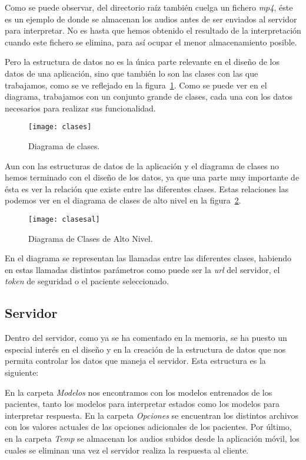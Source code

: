Como se puede observar, del directorio raíz también cuelga un fichero \textit{mp4}, éste es un ejemplo de donde se almacenan los audios antes de ser enviados al servidor para interpretar. No es hasta que hemos obtenido el resultado de la interpretación cuando este fichero se elimina, para así ocupar el menor almacenamiento posible.

Pero la estructura de datos no es la única parte relevante en el diseño de los datos de una aplicación, sino que también lo son las clases con las que trabajamos, como se ve reflejado en la figura~\ref{fig:clases}. Como se puede ver en el diagrama, trabajamos con un conjunto grande de clases, cada una con los datos necesarios para realizar sus funcionalidad.

\begin{figure}[H]
	\centering
	\texttt{[image: clases]}
	\caption{Diagrama de clases.}
	\label{fig:clases}
\end{figure}

Aun con las estructuras de datos de la aplicación y el diagrama de clases no hemos terminado con el diseño de los datos, ya que una parte muy importante de ésta es ver la relación que existe entre las diferentes clases. Estas relaciones las podemos ver en el diagrama de clases de alto nivel en la figura~\ref{fig:clasesal}.

\begin{figure}[H]
	\centering
	\texttt{[image: clasesal]}
	\caption{Diagrama de Clases de Alto Nivel.}
	\label{fig:clasesal}
\end{figure}

En el diagrama se representan las llamadas entre las diferentes clases, habiendo en estas llamadas distintos parámetros como puede ser la \textit{url} del servidor, el \textit{token} de seguridad o el paciente seleccionado.

\subsection{Servidor} \label{server}
Dentro del servidor, como ya se ha comentado en la memoria, se ha puesto un especial interés en el diseño y en la creación de la estructura de datos que nos permita controlar los datos que maneja el servidor. Esta estructura es la siguiente:

En la carpeta \textit{Modelos} nos encontramos con los modelos entrenados de los pacientes, tanto los modelos para interpretar estados como los modelos para interpretar respuesta. En la carpeta \textit{Opciones} se encuentran los distintos archivos con los valores actuales de las opciones adicionales de los pacientes. Por último, en la carpeta \textit{Temp} se almacenan los audios subidos desde la aplicación móvil, los cuales se eliminan una vez el servidor realiza la respuesta al cliente.
\newpage
